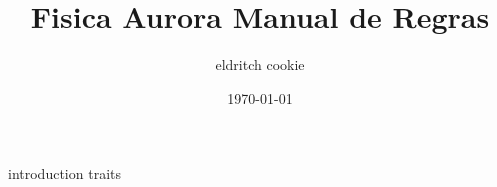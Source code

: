\documentclass[portuguese]{book}
\title{Fisica Aurora Manual de Regras}
\date{\today}
\author{eldritch cookie}
\begin{document}
\pagecolor{cyan}
  \maketitle
  \newpage
  \tableofcontents
  {introduction}
  {traits}
\end{document}
